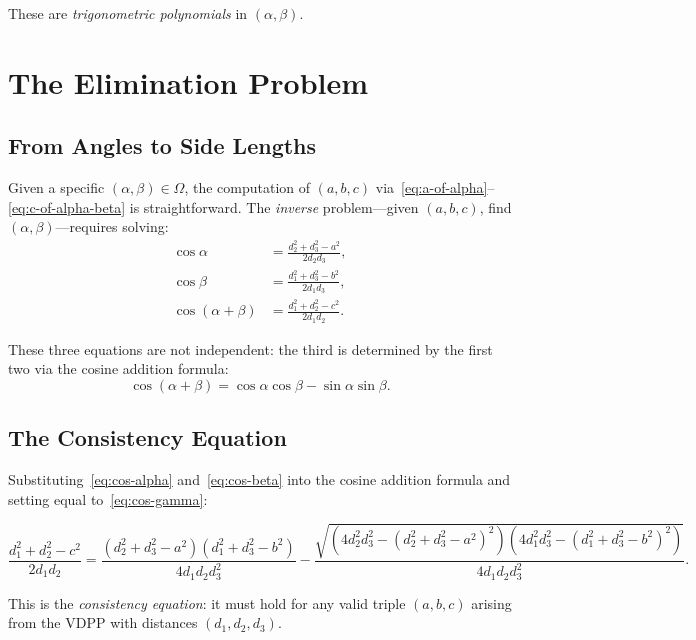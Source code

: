 These are \emph{trigonometric polynomials} in $(\alpha, \beta)$.

\section{The Elimination Problem}

\subsection{From Angles to Side Lengths}

Given a specific $(\alpha, \beta) \in \Omega$, the computation of $(a, b, c)$ via~\eqref{eq:a-of-alpha}--\eqref{eq:c-of-alpha-beta} is straightforward. The \emph{inverse} problem---given $(a, b, c)$, find $(\alpha, \beta)$---requires solving:
\begin{align}
\cos\alpha &= \frac{d_2^2 + d_3^2 - a^2}{2d_2 d_3}, \label{eq:cos-alpha} \\
\cos\beta &= \frac{d_1^2 + d_3^2 - b^2}{2d_1 d_3}, \label{eq:cos-beta} \\
\cos(\alpha + \beta) &= \frac{d_1^2 + d_2^2 - c^2}{2d_1 d_2}. \label{eq:cos-gamma}
\end{align}

These three equations are not independent: the third is determined by the first two via the cosine addition formula:
\begin{equation}
\cos(\alpha + \beta) = \cos\alpha \cos\beta - \sin\alpha \sin\beta.
\end{equation}

\subsection{The Consistency Equation}

Substituting~\eqref{eq:cos-alpha} and~\eqref{eq:cos-beta} into the cosine addition formula and setting equal to~\eqref{eq:cos-gamma}:

\begin{equation}
\label{eq:consistency}
\frac{d_1^2 + d_2^2 - c^2}{2d_1 d_2} = \frac{(d_2^2 + d_3^2 - a^2)(d_1^2 + d_3^2 - b^2)}{4d_1 d_2 d_3^2} - \frac{\sqrt{(4d_2^2 d_3^2 - (d_2^2 + d_3^2 - a^2)^2)(4d_1^2 d_3^2 - (d_1^2 + d_3^2 - b^2)^2)}}{4d_1 d_2 d_3^2}.
\end{equation}

This is the \emph{consistency equation}: it must hold for any valid triple $(a, b, c)$ arising from the VDPP with distances $(d_1, d_2, d_3)$.

